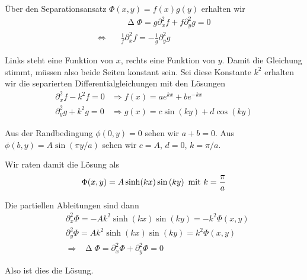 \documentclass[a4paper,german,12pt,smallheadings]{scrartcl}
\newcommand*\laplace{\mathop{}\!\mathbin\Delta}
\begin{document}
Über den Separationsansatz $\Phi(x,y) = f(x) g(y)$ erhalten wir
\begin{align*}
  &\laplace \Phi = g \partial_x^2 f + f \partial_y^2 g = 0 \\
  \Leftrightarrow \quad
  & \frac{1}{f} \partial_x^2 f = -\frac{1}{g} \partial_y^2 g
\end{align*}

Links steht eine Funktion von $x$, rechts eine Funktion von $y$. Damit die
Gleichung stimmt, müssen also beide Seiten konstant sein. Sei diese Konstante
$k^2$ erhalten wir die separierten Differentialgleichungen mit den Lösungen
\begin{align*}
  \partial_x^2 f - k^2f = 0 &\Rightarrow f(x) = ae^{kx} + be^{-kx} \\
  \partial_y^2 g + k^2g = 0 &\Rightarrow g(x) = c \sin(ky) + d \cos(ky)
\end{align*}

Aus der Randbedingung $\phi(0,y) = 0$ sehen wir $a + b
= 0$. Aus $\phi(b,y) = A \sin(\pi y /a)$ sehen wir $c = A$, $d=0$, $k = \pi/a$.

Wir raten damit die Lösung als
\begin{equation}
  \Phi(x,y) = A \sinh(kx) \sin\del{ky} \text{ mit } k = \frac{\pi}{a}
\end{equation}

Die partiellen Ableitungen sind dann
\begin{align*}
  &\partial_x^2 \Phi = -Ak^2 \sinh(kx) \sin(ky) = -k^2 \Phi(x,y) \\
  &\partial_y^2 \Phi = Ak^2 \sinh(kx) \sin(ky) = k^2 \Phi(x,y) \\
  &\Rightarrow \laplace \Phi = \partial_x^2 \Phi + \partial_y^2 \Phi = 0
\end{align*}

Also ist dies die Lösung.
\end{document}
